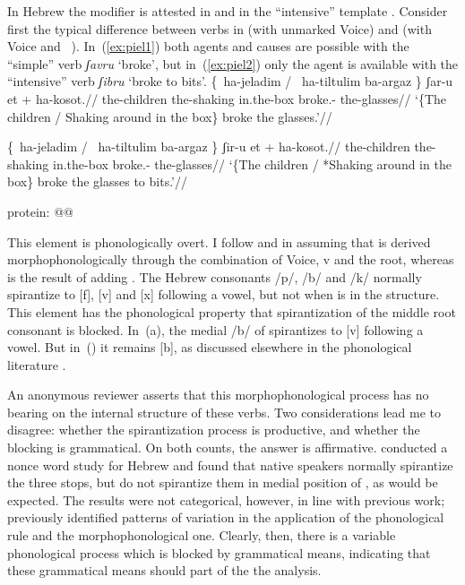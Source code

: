 In Hebrew the modifier {\va} is attested in {\thit} and in the ``intensive'' template {\tpie}. Consider first the typical difference between verbs in {\tkal} (with unmarked Voice) and {\tpie} (with Voice and \va~\!). In~(\ref{ex:piel1}) both agents and causes are possible with the ``simple'' {\tkal} verb \emph{ʃavru} `broke', but in~(\ref{ex:piel2}) only the agent is available with the ``intensive'' {\tpie} verb \emph{ʃibru} `broke to bits'.
\pex \citet[20]{doron03}
	\a \label{ex:piel1}\begingl
	\gla \{\cmark~ha-jeladim / \cmark~ha-tiltulim ba-argaz \} ʃar-u et + \phantom{\{\cmark~}ha-kosot.//
	\glb \phantom{\{\cmark~}the-children {} \phantom{\cmark~}the-shaking in.the-box {} broke.-  \phantom{\{\cmark~}the-glasses//
	\glft `\{The children / Shaking around in the box\} broke the glasses.'//
	\endgl

	\a \label{ex:piel2}\begingl
	\gla \{\cmark~ha-jeladim / \xmark~ha-tiltulim ba-argaz \} ʃir-u et + \phantom{\{\cmark~}ha-kosot.//
	\glb \phantom{\{\cmark~}the-children {} \phantom{\xmark~}the-shaking in.the-box {} broke.-  \phantom{\{\cmark~}the-glasses//
	\glft `\{The children / *Shaking around in the box\} broke the glasses to bits.'//
	\endgl
\xe

protein:
@@

This element is phonologically overt. I follow \cite{doron03} and \cite{kastner16nllt} in assuming that {\tkal} is derived morphophonologically through the combination of Voice, v and the root, whereas {\tpie} is the result of adding {\va}. The Hebrew consonants /p/, /b/ and /k/ normally spirantize to [f], [v] and [x] following a vowel, but not when {\va} is in the structure. This element has the phonological property that spirantization of the middle root consonant is blocked. In~(\lastx a), the medial /b/ of  spirantizes to [v] following a vowel. But in~(\lastx) it remains [b], as discussed elsewhere in the phonological literature \citep{temkinmartinez08wccfl,gouskova12nllt,kastner16nllt}. 

An anonymous reviewer asserts that this morphophonological process has no bearing on the internal structure of these verbs. Two considerations lead me to disagree: whether the spirantization process is productive, and whether the blocking is grammatical. On both counts, the answer is affirmative. \cite{temkinmartinzemuellner16} conducted a nonce word study for Hebrew and found that native speakers normally spirantize the three stops, but do not spirantize them in medial position of {\tpie}, as would be expected. The results were not categorical, however, in line with previous work; \cite{adam02} previously identified patterns of variation in the application of the phonological rule and the morphophonological one. Clearly, then, there is a variable phonological process which is blocked by grammatical means, indicating that these grammatical means should part of the the analysis.




